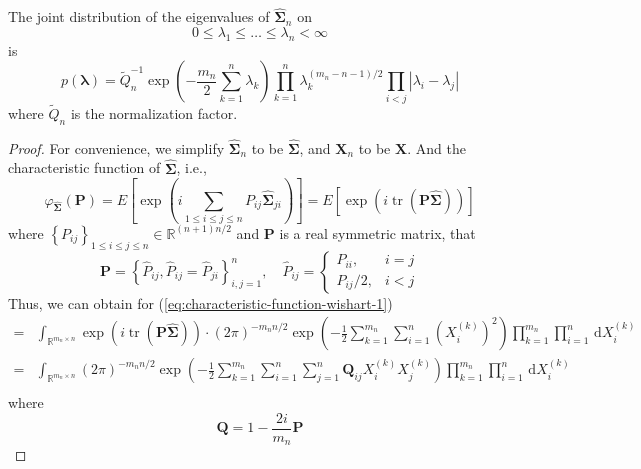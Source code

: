 \begin{theorem}
    The joint distribution of the eigenvalues of $\widehat{\boldsymbol{\Sigma}}_{n}$ on
    \begin{equation}
        0\leq\lambda_{1}\leq\ldots\leq\lambda_{n}<\infty
    \end{equation}
    is
    \begin{equation}
        p\left(\boldsymbol{\lambda}\right)=\tilde{Q}_{n}^{-1}\exp\left(-\frac{m_{n}}{2}\sum_{k=1}^{n}\lambda_{k}\right)\prod_{k=1}^{n}\lambda_{k}^{(m_{n}-n-1)/2}\prod_{i<j}\left|\lambda_{i}-\lambda_{j}\right|
        \label{eq:jpdf-eigenvalues}
    \end{equation}
    where $\tilde{Q}_{n}$ is the normalization factor.
\end{theorem}
\begin{proof}
    For convenience, we simplify $\widehat{\boldsymbol{\Sigma}}_{n}$  to be $\widehat{\boldsymbol{\Sigma}}$, and $\mathbf{X}_{n}$ to be $\mathbf{X}$. And the characteristic function of $\widehat{\boldsymbol{\Sigma}}$, i.e.,
    \begin{equation}
        \varphi_{\widehat{\boldsymbol{\Sigma}}}\left(\mathbf{P}\right)=E\left[\exp\left(i\sum_{1\leq i\leq j\leq n}P_{ij}\widehat{\boldsymbol{\Sigma}}_{ji}\right)\right]=E\left[\exp\left(i\operatorname{tr}\left(\mathbf{P}\widehat{\boldsymbol{\Sigma}}\right)\right)\right]
        \label{eq:characteristic-function-wishart-1}
    \end{equation}
    where $\left\{P_{ij}\right\}_{1\leq i\leq j\leq n}\in\mathbb{R}^{(n+1)n/2}$ and $\mathbf{P}$ is a real symmetric matrix, that
    \begin{equation}
        \mathbf{P}=\left\{\widehat{P}_{ij},\widehat{P}_{ij}=\widehat{P}_{ji}\right\}_{i,j=1}^{n},\quad\widehat{P}_{ij}=\begin{cases}P_{ii}, & i=j \\ P_{i j} / 2, & i<j \end{cases}
    \end{equation}
    Thus, we can obtain for (\ref{eq:characteristic-function-wishart-1})
    \begin{equation*}
        \begin{aligned}
            = & \int_{\mathbb{R}^{m_{n}\times n}}\exp\left(i\operatorname{tr}\left(\mathbf{P}\widehat{\boldsymbol{\Sigma}}\right)\right)\cdot(2\pi)^{-m_{n}n/2}\exp\left(-\frac{1}{2}\sum_{k=1}^{m_{n}}\sum_{i=1}^{n}\left(X_{i}^{(k)}\right)^{2}\right)\prod_{k=1}^{m_{n}}\prod_{i=1}^{n}\,\mathrm{d}X_{i}^{(k)} \\
            = & \int_{\mathbb{R}^{m_{n}\times n}}(2\pi)^{-m_{n}n/2}\exp\left(-\frac{1}{2}\sum_{k=1}^{m_{n}}\sum_{i=1}^{n}\sum_{j=1}^{n}\mathbf{Q}_{ij}X_{i}^{(k)}X_{j}^{(k)}\right)\prod_{k=1}^{m_{n}}\prod_{i=1}^{n}\,\mathrm{d}X_{i}^{(k)}                                                                      \\
        \end{aligned}
    \end{equation*}
    where
    \begin{equation}
        \mathbf{Q}=1-\frac{2i}{m_{n}}\mathbf{P}
    \end{equation}


\end{proof}
